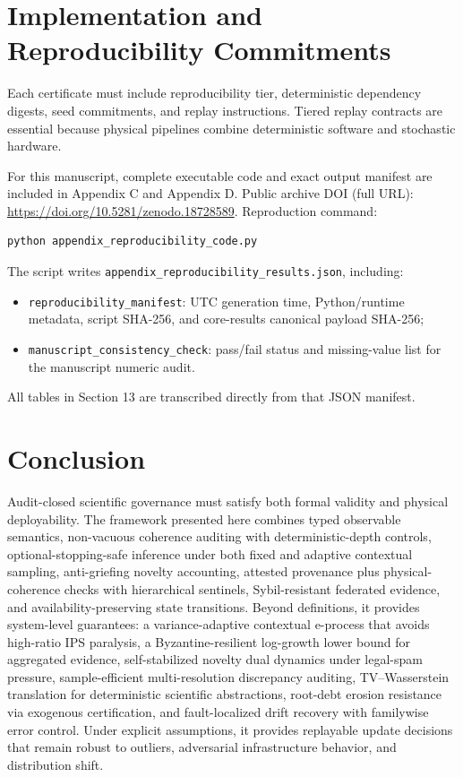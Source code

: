 \documentclass[11pt,a4paper]{article}
\begin{document}
\section{Implementation and Reproducibility Commitments}

Each certificate must include reproducibility tier, deterministic dependency digests, seed commitments, and replay instructions.
Tiered replay contracts are essential because physical pipelines combine deterministic software and stochastic hardware.

For this manuscript, complete executable code and exact output manifest are included in Appendix C and Appendix D.
Public archive DOI (full URL): \url{https://doi.org/10.5281/zenodo.18728589}.
Reproduction command:
\begin{verbatim}
python appendix_reproducibility_code.py
\end{verbatim}
The script writes \texttt{appendix\_reproducibility\_results.json}, including:
\begin{itemize}[leftmargin=*]
\item \texttt{reproducibility\_manifest}: UTC generation time, Python/runtime metadata, script SHA-256, and core-results canonical payload SHA-256;
\item \texttt{manuscript\_consistency\_check}: pass/fail status and missing-value list for the manuscript numeric audit.
\end{itemize}
All tables in Section 13 are transcribed directly from that JSON manifest.

\section{Conclusion}

Audit-closed scientific governance must satisfy both formal validity and physical deployability.
The framework presented here combines typed observable semantics, non-vacuous coherence auditing with deterministic-depth controls, optional-stopping-safe inference under both fixed and adaptive contextual sampling, anti-griefing novelty accounting, attested provenance plus physical-coherence checks with hierarchical sentinels, Sybil-resistant federated evidence, and availability-preserving state transitions.
Beyond definitions, it provides system-level guarantees: a variance-adaptive contextual e-process that avoids high-ratio IPS paralysis, a Byzantine-resilient log-growth lower bound for aggregated evidence, self-stabilized novelty dual dynamics under legal-spam pressure, sample-efficient multi-resolution discrepancy auditing, TV--Wasserstein translation for deterministic scientific abstractions, root-debt erosion resistance via exogenous certification, and fault-localized drift recovery with familywise error control.
Under explicit assumptions, it provides replayable update decisions that remain robust to outliers, adversarial infrastructure behavior, and distribution shift.
\end{document}
